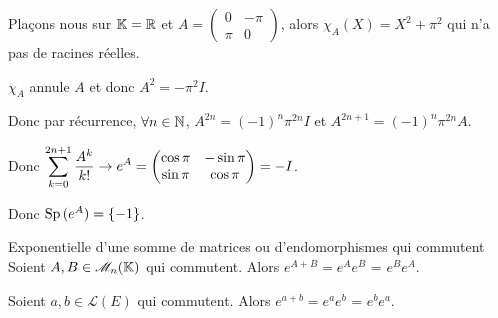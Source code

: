 
\begin{exemple}
    Plaçons nous sur $\mathbb{K} = \mathbb{R}$ et $A = \begin{pmatrix}
    0 & -\pi \\
    \pi & 0
    \end{pmatrix}$, alors $\chi_A(X) = X^2 + \pi^2$ qui n'a pas de racines réelles. 

    $\chi_A$ annule $A$ et donc $A^2 = -\pi^2 I$. 

    Donc par récurrence, $\forall n \in \mathbb{N}$, $A^{2n} = (-1)^n \pi^{2n} I$ et $A^{2n + 1} = (-1)^n \pi^{2n} A$.

    Donc $\displaystyle \sum_{k = 0}^{2n + 1} \frac{A^k}{k!} \to e^A = \begin{pmatrix}
    \cos \pi & -\sin \pi \\
    \sin \pi & \cos \pi
    \end{pmatrix} = -I$.

    Donc $\operatorname{Sp} \,(e^A) = \{-1\}$. 
\end{exemple}


\begin{theorement}{Exponentielle d'une somme de matrices ou d'endomorphismes qui commutent}{}
    Soient $A, B \in \mathscr M_n(\mathbb{K})$ qui commutent. Alors $e^{A + B} = e^A e^B$ = $e^B e^A$.
    
    Soient $a, b \in \mathscr L(E)$ qui commutent. Alors $e^{a + b} = e^a e^b$ = $e^b e^a$.
\end{theorement}


